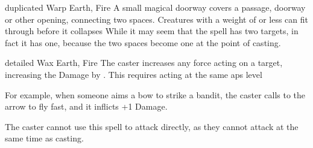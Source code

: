   {duplicated}%
  {Warp}%
  {Earth, Fire}%
  {}%
  {A small magical doorway covers a passage, doorway or other opening, connecting two spaces.
  Creatures with a \gls{weight} of  or less can fit through before it collapses}%
  {While it may seem that the spell has two targets, in fact it has one, because the two spaces become one at the point of casting.}

  {detailed}%
  {Wax}%
  {Earth, Fire}%
  {}%
  {The caster increases any force acting on a target, increasing the Damage by . This requires acting at the same \glspl{ap} level}%
  {For example, when someone aims a bow to strike a bandit, the caster calls to the arrow to fly fast, and it inflicts +1 Damage.

    The caster cannot use this spell to attack directly, as they cannot attack at the same time as casting.}

